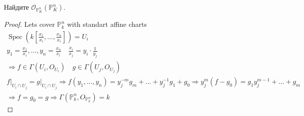 \begin{prob}
Найдите $\mathcal{O}_{\mathbb{P}_K^n}\left(\mathbb{P}_K^n\right)$.
\end{prob}
\begin{proof}
	Lets cover $\mathbb{P}^n_k$ with standart affine charts
	\begin{gather*}
		\operatorname{Spec}\left(k\left[\frac{x_1}{x_i},\ldots,\frac{x_n}{x_i}\right]\right) = U_i\\
		y_1 = \frac{x_1}{x_i},\ldots, y_n = \frac{x_n}{x_i}\quad \frac{x_i}{x_j} = y_i \cdot \frac{1}{y_j}\\
		\Rightarrow f \in \Gamma(U_i, O_{U_i})\quad g \in \Gamma(U_j, O_{U_j})\\
		f\bigg|_{U_i \cap U_j} = g\bigg|_{U_i \cap U_j}
		\Rightarrow f(y_1, \ldots, y_n) = y_j^{-m} g_m + \ldots + y_j^{-1} g_1 + g_0
		\Rightarrow y_j^m(f - g_0) = g_1 y_j^{m-1} + \ldots + g_m\\
		\Rightarrow f = g_0 = g
		\Rightarrow \Gamma(\mathbb{P}^n_k, O_{\mathbb{P}^n_k}) = k
	\end{gather*}
\end{proof}
\begin{comment}
https://blag.nullteilerfrei.de/wp-content/uploads/2013/04/vector-bundles.pdf
https://math.stackexchange.com/questions/2273224/two-definitions-of-mathcalo-mathbbpnl
\end{comment}